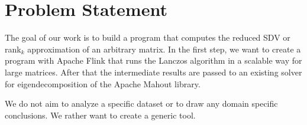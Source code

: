 \section{Problem Statement}

The goal of our work is to build a program that computes the reduced SDV or
rank$_k$ approximation of an arbitrary matrix. In the first step, we want to
create a program with Apache Flink that runs the Lanczos algorithm in a
scalable way for large matrices. After that the intermediate results are passed
to an existing solver for eigendecomposition of the Apache Mahout library.

We do not aim to analyze a specific dataset or to draw any domain specific
conclusions. We rather want to create a generic tool.